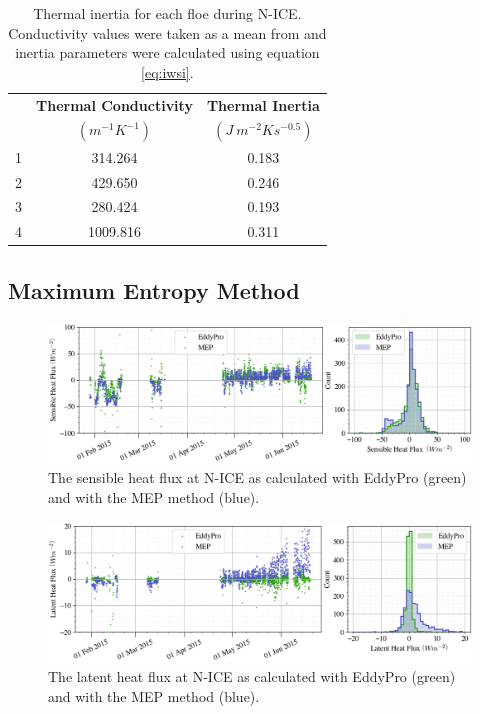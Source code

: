 \begin{table}[h]
\centering
\footnotesize
\doublespacing
{
\begin{tabular}{| c | c | c |}
 \hline
\rowcolor[HTML]{F3F3F3}  & \textbf{Thermal Conductivity} & \textbf{Thermal Inertia}\\
 \rowcolor[HTML]{F3F3F3}\multirow{-2}{*}{\textbf{Floe}} & $(m^{-1}K^{-1})$ & $(J~m^{-2}Ks^{-0.5})$ \\
  \hline
 1 & 314.264 & 0.183  \\
 2 & 429.650 & 0.246 \\ 
 3 & 280.424 & 0.193 \\
 4 & 1009.816 & 0.311 \\
  \hline
\end{tabular}}
\caption{Thermal inertia for each floe during N-ICE. Conductivity values were taken as a mean from \citet{merkouriadi:2017} and inertia parameters were calculated using equation \ref{eq:iwsi}.}
\label{tab:thermal}
\end{table}

 \subsection{Maximum Entropy Method}

\begin{figure}[h]
    \centering
    \includegraphics[width=1\linewidth]{figures/chapter5/MEPSensible.png}
    \caption[Sensible heat flux from the MEP method compared to EddyPro.]{The sensible heat flux at N-ICE as calculated with EddyPro (green) and with the MEP method (blue).}
    \label{fig:mep:sensible}
\end{figure}

\begin{figure}[h]
    \centering
    \includegraphics[width=1\linewidth]{figures/chapter5/MEPLatent.png}
    \caption[Latent heat flux from the MEP method compared to EddyPro.]{The latent heat flux at N-ICE as calculated with EddyPro (green) and with the MEP method (blue).}
    \label{fig:mep:latent}
\end{figure}

